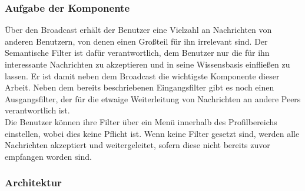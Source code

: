 \subsubsection{Aufgabe der Komponente}
Über den Broadcast erhält der Benutzer eine Vielzahl an Nachrichten von anderen Benutzern, von denen einen Großteil für ihn irrelevant sind. Der Semantische Filter ist dafür verantwortlich, dem Benutzer nur die für ihn interessante Nachrichten zu akzeptieren und in seine Wissensbasis einfließen zu lassen. Er ist damit neben dem Broadcast die wichtigste Komponente dieser Arbeit. Neben dem bereits beschriebenen Eingangsfilter gibt es noch einen Ausgangsfilter, der für die etwaige Weiterleitung von Nachrichten an andere Peers verantwortlich ist. 
\\Die Benutzer können ihre Filter über ein Menü innerhalb des Profilbereichs einstellen, wobei dies keine Pflicht ist. Wenn keine Filter gesetzt sind, werden alle Nachrichten akzeptiert und weitergeleitet, sofern diese nicht bereits zuvor empfangen worden sind. 

\subsubsection{Architektur}

